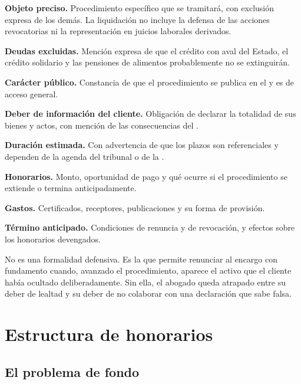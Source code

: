 \begin{checklist}
  \item \textbf{Objeto preciso.} Procedimiento específico que se tramitará, con exclusión
  expresa de los demás. La liquidación no incluye la defensa de las acciones revocatorias
  ni la representación en juicios laborales derivados.
  \item \textbf{Deudas excluidas.} Mención expresa de que el crédito con aval del Estado,
  el crédito solidario y las pensiones de alimentos probablemente no se extinguirán.
  \item \textbf{Carácter público.} Constancia de que el procedimiento se publica en el
  \boletin{} y es de acceso general.
  \item \textbf{Deber de información del cliente.} Obligación de declarar la totalidad de
  sus bienes y actos, con mención de las consecuencias del .
  \item \textbf{Duración estimada.} Con advertencia de que los plazos son referenciales y
  dependen de la agenda del tribunal o de la \superir{}.
  \item \textbf{Honorarios.} Monto, oportunidad de pago y qué ocurre si el procedimiento
  se extiende o termina anticipadamente.
  \item \textbf{Gastos.} Certificados, receptores, publicaciones y su forma de provisión.
  \item \textbf{Término anticipado.} Condiciones de renuncia y de revocación, y efectos
  sobre los honorarios devengados.
\end{checklist}

\begin{alerta}
No es una formalidad defensiva. Es la que permite renunciar al encargo con fundamento
cuando, avanzado el procedimiento, aparece el activo que el cliente había ocultado
deliberadamente. Sin ella, el abogado queda atrapado entre su deber de lealtad y su deber
de no colaborar con una declaración que sabe falsa.
\end{alerta}

\section{Estructura de honorarios}

\subsection{El problema de fondo}

